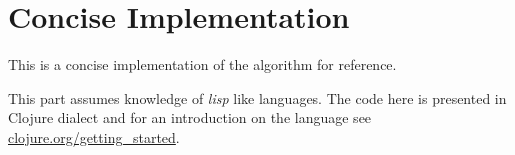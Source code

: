 \chapter{Concise Implementation}
\label{add:epps}

This is a concise implementation of the algorithm for reference.

This part assumes knowledge of \emph{lisp} like languages. 
The code here is presented in Clojure dialect and for an 
introduction on the language see \url{clojure.org/getting_started}.

